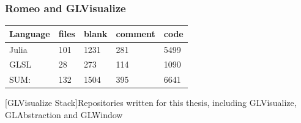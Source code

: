 \subsubsection{Romeo and GLVisualize}

\begin{table}[htbp]
    \centering
    \begin{tabular}{l|l|l|l|l}
        \hline
        \textbf{Language} & \textbf{files}    &   \textbf{blank}   &   \textbf{comment}    &  \textbf{code}\\
        \hline
        Julia  &  101   &    1231 &   281  &  5499\\
        GLSL   &   28  &   273   &    114 &  1090\\
        \hline
        SUM: & 132  &  1504  &     395    &   6641\\
        \hline
    \end{tabular}
    [GLVisualize Stack]{Repositories written for this thesis, including GLVisualize, GLAbstraction and GLWindow}
    \label{table:romeo_loc}
\end{table}

